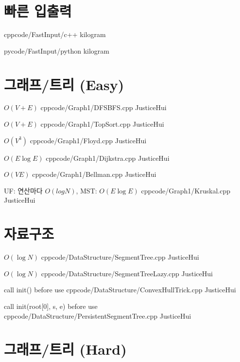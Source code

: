 \documentclass[landscape, 8pt, a4paper, twocolumn]{extarticle} %
\begin{document}
\maketitlepage

\pagebreak 

\section{빠른 입출력}

{}{}
{cpp}{code/FastInput/c++}
{kilogram}

{}{}
{py}{code/FastInput/python}
{kilogram}

\section{그래프/트리 (Easy)}

{}{$O(V+E)$}
{cpp}{code/Graph1/DFSBFS.cpp}
{JusticeHui}

{}{$O(V+E)$}
{cpp}{code/Graph1/TopSort.cpp}
{JusticeHui}

{}{$O(V^3)$}
{cpp}{code/Graph1/Floyd.cpp}
{JusticeHui}

{}{$O(E\log E)$}
{cpp}{code/Graph1/Dijkstra.cpp}
{JusticeHui}

{}{$O(VE)$}
{cpp}{code/Graph1/Bellman.cpp}
{JusticeHui}

{}{UF: 연산마다 $O(log N)$, MST: $O(E \log E)$}
{cpp}{code/Graph1/Kruskal.cpp}
{JusticeHui}

\section{자료구조}

{}{$O(\log N)$}
{cpp}{code/DataStructure/SegmentTree.cpp}
{JusticeHui}

{}{$O(\log N)$}
{cpp}{code/DataStructure/SegmentTreeLazy.cpp}
{JusticeHui}

{call init() before use}{}
{cpp}{code/DataStructure/ConvexHullTrick.cpp}
{JusticeHui}

{call init(root[0], s, e) before use}{}
{cpp}{code/DataStructure/PersistentSegmentTree.cpp}
{JusticeHui}

\section{그래프/트리 (Hard)}
\end{document}
